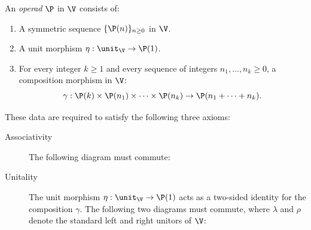 \documentclass{tac}
\def\id{\operatorname{id}}
\begin{document}
\begin{definition}
An \emph{operad} $\P$ in $\V$ consists of:
\begin{enumerate}
    \item A symmetric sequence $\{\P(n)\}_{n \ge 0}$ in $\V$.
    \item A unit morphism $\eta: \unit_{\V} \to \P(1)$.
    \item For every integer $k \ge 1$ and every sequence of integers $n_1, \dots, n_k \ge 0$, a composition morphism in $\V$:
    \begin{equation*}
        \gamma: \P(k) \times \P(n_1) \times \cdots \times \P(n_k) \to \P(n_1 + \dots + n_k).
    \end{equation*}
\end{enumerate}
These data are required to satisfy the following three axioms:

\begin{description}
    \item[Associativity] 
    The following diagram must commute:
    \begin{center}
    \end{center}

    \item[Unitality] 
    The unit morphism $\eta: \unit_{\V} \to \P(1)$ acts as a two-sided identity for the composition $\gamma$.  The following two diagrams must commute, where $\lambda$ and $\rho$ denote the standard left and right unitors of $\V$:
    \begin{center}
\end{center}
\end{description}
\end{definition}
\end{document}
